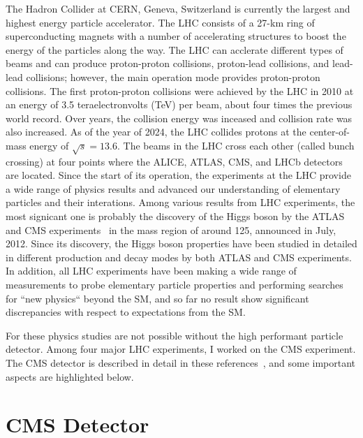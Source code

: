 %
%
The Hadron Collider at CERN, Geneva, Switzerland is currently the largest and highest energy particle accelerator.
The LHC consists of a 27-km ring of superconducting magnets with a number of accelerating structures to boost the energy of the particles along the way.
The LHC can acclerate different types of beams and can produce proton-proton collisions, proton-lead collisions, and lead-lead collisions; however, the main operation mode provides proton-proton collisions.
%
The first proton-proton collisions were achieved by the LHC in 2010 at an energy of 3.5 teraelectronvolts (TeV) per beam, about four times the previous world record.
Over years, the collision energy was inceased and collision rate was also increased.
As of the year of 2024, the LHC collides protons at the center-of-mass energy of $\sqrt{s}=13.6$\TeV.
%
The beams in the LHC cross each other (called bunch crossing) at four points where the ALICE, ATLAS, CMS, and LHCb detectors are located.
%
Since the start of its operation, the experiments at the LHC provide a wide range of physics results and advanced our understanding of elementary particles and their interations.
%
Among various results from LHC experiments, the most signicant one is probably the discovery of the Higgs boson by the ATLAS and CMS experiments~\cite{ATLAS:2012yve,CMS:2012qbp,CMS:2013btf}
in the mass region of around 125\GeV, announced in July, 2012.
%
Since its discovery, the Higgs boson properties have been studied in detailed in different production and decay modes by both ATLAS and CMS experiments.
In addition, all LHC experiments have been making a wide range of measurements to probe elementary particle properties and performing searches for ``new physics`` beyond the SM, and so far no result show significant discrepancies with respect to expectations from the SM.

%
%
%
For these physics studies are not possible without the high performant particle detector.
Among four major LHC experiments, I worked on the CMS experiment.
The CMS detector is described in detail in these references~\cite{CMS,CMS:2023gfb}, and some important aspects are highlighted below.

%
%
%
\section{CMS Detector}

